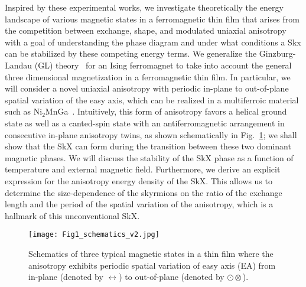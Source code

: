 \documentclass[10pt,onecolumn,prb,aps,notitlepage]{revtex4}
\begin{document}
Inspired by these experimental works, we investigate theoretically the
energy landscape of various magnetic states in
a ferromagnetic thin film that arises from the competition between
exchange, shape, and modulated uniaxial anisotropy with a goal of understanding the phase diagram and under what conditions a Skx can be stabilized by these competing energy terms. We generalize the Ginzburg-Landau (GL) theory~\cite{Garel82PRB_Ginzberg-Landau} for
an Ising ferromagnet to take into account the general three
dimensional magnetization in a ferromagnetic thin film.
%
In particular, we will
consider a novel uniaxial anisotropy with periodic in-plane to out-of-plane spatial variation of the easy
axis, which can be realized in a
multiferroic material such as Ni$_{2}$MnGa~\cite{Phatak16NanoLett_skyrm-multiferro}. Intuitively, this form of
anisotropy favors a helical ground state as well as a canted-spin state with
an antiferromagnetic
arrangement in consecutive in-plane anisotropy twins, as shown schematically in
Fig.~\ref{fig:schematics}; we shall show that the SkX can form during the transition between these two dominant
magnetic phases. We will discuss the stability of the SkX phase as a
function of temperature and external magnetic field. Furthermore, we derive an explicit expression for the anisotropy energy density of the SkX.
This allows us to determine the size-dependence of the skyrmions on the ratio of the exchange length and the period of the spatial variation of the anisotropy, which is a hallmark of this unconventional SkX.

\begin{figure}[tph]
\centering
\texttt{[image: Fig1\_schematics\_v2.jpg]}
\caption{Schematics of three typical magnetic states in a thin film where the anisotropy exhibits periodic spatial variation of easy axis (EA) from in-plane (denoted by $\leftrightarrow$) to out-of-plane (denoted by $\odot \otimes$).}
\label{fig:schematics}
\end{figure}
\end{document}
